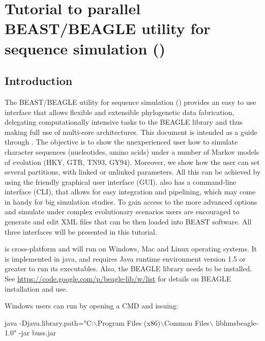 \chapter{Tutorial to parallel BEAST/BEAGLE utility for sequence simulation ({\bussname})\label{app:pibuss_tuto}}

\section{Introduction} %

The BEAST/BEAGLE utility for sequence simulation ({\bussname}) provides an easy to use interface that allows flexible and extensible phylogenetic data fabrication, delegating computationally intensive tasks to the BEAGLE library and thus making full use of multi-core architectures.
This document is intended as a guide through {\bussname}. The objective is to show the unexperienced user how to simulate character sequences (nucleotides, amino acids)  under a number of Markov models of evolution (HKY, GTR, TN93, GY94). Moreover, we show  how the user can set several partitions, with linked or unlinked parameters. All this can be achieved by using the friendly graphical user interface (GUI). {\bussname} also has a command-line interface (CLI), that allows for easy integration and pipelining, which may come in handy for big simulation studies. 
To gain access to the more advanced options and simulate under complex evolutionary scenarios users are encouraged to generate and edit XML files that can be then loaded into BEAST software.
All three interfaces will be presented in this tutorial.

{\bussname} is cross-platform and will run on Windows, Mac and Linux operating systems. It is implemented in java, and requires Java runtime environment version 1.5 or greater to run its executables. Also, the BEAGLE library needs to be installed. See \url{https://code.google.com/p/beagle-lib/w/list} for details on BEAGLE installation and use.

Windows users can run {\bussname} by opening a CMD and issuing:
 
\begin{code}
java -Djava.library.path="C:$\backslash$Program Files (x86)$\backslash$Common Files$\backslash$ libhmsbeagle-1.0" -jar buss.jar
\end{code}
 

